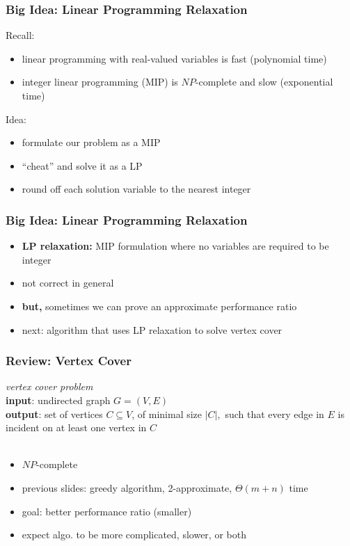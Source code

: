 \documentclass{beamer}
\newcommand{\stanza}{ \\~\ }
\begin{document}
\begin{frame} \frametitle{Big Idea: Linear Programming Relaxation}
Recall:
\begin{itemize}
  \item linear programming with real-valued variables is fast (polynomial time)
  \item integer linear programming (MIP) is $NP$-complete and slow (exponential time)
\end{itemize}

Idea:
\begin{itemize}
  \item formulate our problem as a MIP
  \item ``cheat'' and solve it as a LP
  \item round off each solution variable to the nearest integer
\end{itemize}
\end{frame}

\begin{frame} \frametitle{Big Idea: Linear Programming Relaxation}
\begin{itemize}
  \item \textbf{LP relaxation:} MIP formulation where no variables are required to be integer
  \item not correct in general
  \item \textbf{but,} sometimes we can prove an approximate performance ratio
  \item next: algorithm that uses LP relaxation to solve vertex cover
\end{itemize}
\end{frame}

\begin{frame} \frametitle{Review: Vertex Cover}
  \emph{vertex cover problem} \\
  \textbf{input}: undirected graph $G=(V,E)$ \\
  \textbf{output}: set of vertices $C \subseteq V$, of minimal size $|C|,$ such
    that every edge in $E$ is incident on at least one vertex in $C$
   \stanza
  \begin{itemize}
    \item $NP$-complete
    \item previous slides: greedy algorithm, 2-approximate, $\Theta(m+n)$ time
    \item goal: better performance ratio (smaller)
    \item expect algo. to be more complicated, slower, or both
  \end{itemize}
\end{frame}
\end{document}
